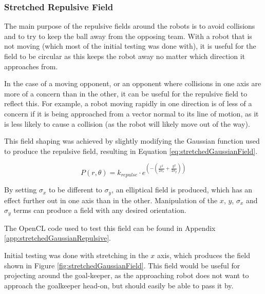 \documentclass[10pt]{article}
\begin{document}
\subsubsection{Stretched Repulsive Field}

The main purpose of the repulsive fields around the robots is to avoid
collisions and to try to keep the ball away from the opposing team.  With a
robot that is not moving (which most of the initial testing was done with), it
is useful for the field to be circular as this keeps the robot away no matter
which direction it approaches from.

In the case of a moving opponent, or an opponent where collisions in one axis
are more of a concern than in the other, it can be useful for the repulsive
field to reflect this.  For example, a robot moving rapidly in one direction is
of less of a concern if it is being approached from a vector normal to its line
of motion, as it is less likely to cause a collision (as the robot will likely
move out of the way).

This field shaping was achieved by slightly modifying the Gaussian function used
to produce the repulsive field, resulting in Equation
\ref{eq:stretchedGaussianField}.

\begin{equation}
P\left(r,\theta\right)=k_{repulse}\cdot
e^{\left(-\left(\frac{x^{2}}{2\sigma_x}+\frac{y^{2}}{2\sigma_y}\right)\right)}\label{eq:stretchedGaussianField}
\end{equation} 

By setting $\sigma_x$ to be different to $\sigma_y$, an elliptical field  is
produced, which has an effect further out in one axis than in the other. 
Manipulation of the $x$, $y$, $\sigma_x$ and $\sigma_y$ terms can produce a
field with any desired orientation.

The OpenCL code used to test this field can be found in Appendix
\ref{app:stretchedGaussianRepulsive}.

Initial testing was done with stretching in the $x$ axis, which produces the
field shown in Figure \ref{fig:stretchedGaussianField}.  This field would be
useful for projecting around the goal-keeper, as the approaching robot does not
want to approach the goalkeeper head-on, but should easily be able to pass it
by.
\end{document}
